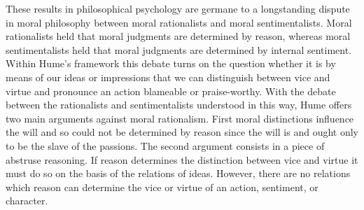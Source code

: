 These results in philosophical psychology are germane to a longstanding dispute in moral philosophy between moral rationalists and moral sentimentalists. Moral rationalists held that moral judgments are determined by reason, whereas moral sentimentalists held that moral judgments are determined by internal sentiment. Within Hume's framework this debate turns on the question whether it is by means of our ideas or impressions that we can distinguish between vice and virtue and pronounce an action blameable or praise-worthy. With the debate between the rationalists and sentimentalists understood in this way, Hume offers two main arguments against moral rationalism. First moral distinctions influence the will and so could not be determined by reason since the will is and ought only to be the slave of the passions. The second argument consists in a piece of abstruse reasoning. If reason determines the distinction between vice and virtue it must do so on the basis of the relations of ideas. However, there are no relations which reason can determine the vice or virtue of an action, sentiment, or character. \change

% 

